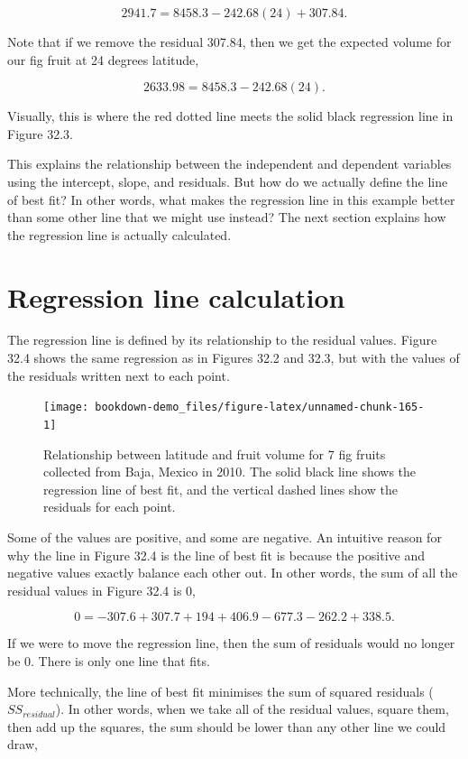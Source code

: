 \documentclass[
]{scrbook}
\begin{document}
\[2941.7 = 8458.3 - 242.68(24) + 307.84.\]

Note that if we remove the residual 307.84, then we get the expected volume for our fig fruit at 24 degrees latitude,

\[2633.98 = 8458.3 - 242.68(24).\]

Visually, this is where the red dotted line meets the solid black regression line in Figure 32.3.

This explains the relationship between the independent and dependent variables using the intercept, slope, and residuals.
But how do we actually define the line of best fit?
In other words, what makes the regression line in this example better than some other line that we might use instead?
The next section explains how the regression line is actually calculated.

\hypertarget{regression-line-calculation}{%
\section{Regression line calculation}\label{regression-line-calculation}}

The regression line is defined by its relationship to the residual values.
Figure 32.4 shows the same regression as in Figures 32.2 and 32.3, but with the values of the residuals written next to each point.

\begin{figure}
\texttt{[image: bookdown-demo\_files/figure-latex/unnamed-chunk-165-1]} \caption{Relationship between latitude and fruit volume for 7 fig fruits collected from Baja, Mexico in 2010. The solid black line shows the regression line of best fit, and the vertical dashed lines show the residuals for each point.}\label{fig:unnamed-chunk-165}
\end{figure}

Some of the values are positive, and some are negative.
An intuitive reason for why the line in Figure 32.4 is the line of best fit is because the positive and negative values exactly balance each other out.
In other words, the sum of all the residual values in Figure 32.4 is 0,

\[0 = -307.6 + 307.7 + 194 + 406.9 - 677.3 - 262.2 + 338.5.\]

If we were to move the regression line, then the sum of residuals would no longer be 0.
There is only one line that fits.

More technically, the line of best fit minimises the sum of squared residuals (\(SS_{residual}\)).
In other words, when we take all of the residual values, square them, then add up the squares, the sum should be lower than any other line we could draw,
\end{document}
